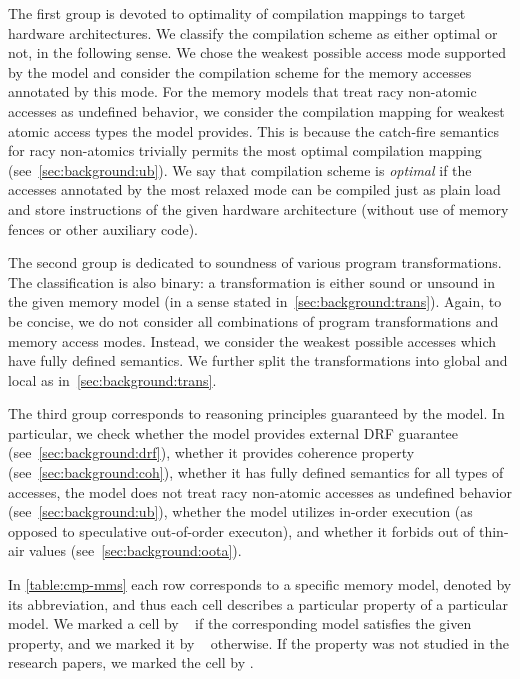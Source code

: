 The first group is devoted to optimality of compilation mappings
to target hardware architectures. We 
classify the compilation scheme as either optimal or not,
in the following sense.
We chose the weakest possible access mode supported by the model
and consider the compilation scheme for the memory accesses annotated by this mode. 
For the memory models that treat racy non-atomic accesses
as undefined behavior, we consider the compilation mapping
for weakest atomic access types the model provides.
This is because the catch-fire semantics for racy non-atomics 
trivially permits the most optimal compilation mapping (see~\cref{sec:background:ub}).
We say that compilation scheme is \emph{optimal} if the 
accesses annotated by the most relaxed mode 
can be compiled just as plain load and store instructions 
of the given hardware architecture 
(\ie without use of memory fences or other auxiliary code). 

The second group is dedicated to soundness of various program transformations. 
The classification is also binary: a transformation is either sound or unsound 
in the given memory model (in a sense stated in~\cref{sec:background:trans}).
Again, to be concise, we do not consider all combinations 
of program transformations and memory access modes. 
Instead, we consider the weakest possible accesses which have fully defined semantics. 
We further split the transformations into global and local as in~\cref{sec:background:trans}.

The third group corresponds to reasoning 
principles guaranteed by the model. In particular, we check 
whether the model provides external DRF guarantee (see~\cref{sec:background:drf}), 
whether it provides coherence property (see~\cref{sec:background:coh}),
whether it has fully defined semantics for all types of accesses, 
\ie the model does not treat racy non-atomic accesses as undefined behavior (see~\cref{sec:background:ub}),
whether the model utilizes in-order execution (as opposed to speculative out-of-order executon),
and whether it forbids out of thin-air values (see~\cref{sec:background:oota}).

In \cref{table:cmp-mms} each row corresponds to 
a specific memory model, denoted by its abbreviation, 
and thus each cell describes a particular property of a particular model. 
We marked a cell by \cmark~ if the corresponding model satisfies the given property,
and we marked it by \xmark~ otherwise.
If the property was not studied in the research papers, we marked the cell by \qmark.

